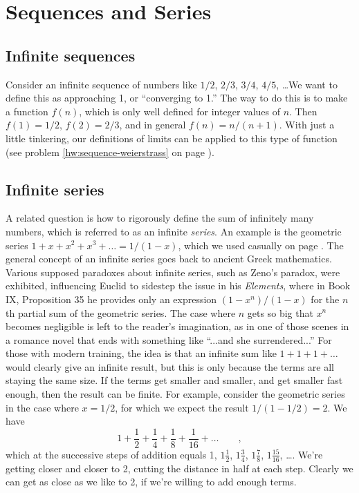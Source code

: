 \chapter{Sequences and Series}\label{ch:sequences}

\section{Infinite sequences}

Consider an infinite sequence of numbers like $1/2$, $2/3$, $3/4$, $4/5$, \ldots We want to define
this as approaching 1, or ``converging to 1.'' The way to do this is to make a function $f(n)$, which is only
well defined for integer values of $n$. Then $f(1)=1/2$, $f(2)=2/3$, and in general
$f(n)=n/(n+1)$. With just a little tinkering, our definitions of limits can be
applied to this type of function  (see problem \ref{hw:sequence-weierstrass} on page \pageref{hw:sequence-weierstrass}).

\section{Infinite series}
A related question is how to rigorously define the sum of infinitely many numbers, which is referred to
as an infinite \emph{series}. An example is the geometric series
$1+x+x^2+x^3+\ldots=1/(1-x)$,
which we used casually on page \pageref{geometric-series}.
The general concept of an infinite series goes back
to ancient Greek mathematics. Various supposed paradoxes about infinite series, such as Zeno's paradox,
were exhibited, influencing Euclid to sidestep the issue in his \emph{Elements}, where in Book IX, Proposition 35
he provides only an expression $(1-x^n)/(1-x)$ for the $n$th partial sum of the geometric series.
The case where $n$ gets so big that $x^n$ becomes negligible is left to the reader's imagination,
as in one of those scenes in a romance novel that ends with something like ``...and she surrendered...''
For those with modern training, the idea is that an infinite sum like $1+1+1+\ldots$ would
clearly give an infinite result, but this is only because the terms are all staying the same size. If the terms get
smaller and smaller, and get smaller fast enough, then the result can be finite. For example, consider the geometric
series in the case where $x=1/2$, for which we expect the result $1/(1-1/2)=2$. We have
\begin{equation*}
  1 + \frac{1}{2} + \frac{1}{4} + \frac{1}{8} + \frac{1}{16} + \ldots \qquad ,
\end{equation*}
which at the successive steps of addition equals 1, $1\frac{1}{2}$, $1\frac{3}{4}$, $1\frac{7}{8}$,  $1\frac{15}{16}$, \ldots.
We're getting closer and closer to 2, cutting the distance in half at each step. Clearly we can get as close as we like to 2,
if we're willing to add enough terms.

